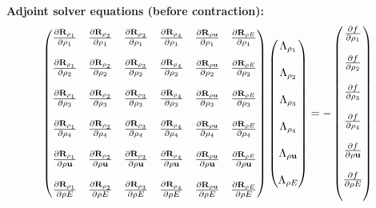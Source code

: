\documentclass[a4paper]{article}
\begin{document}
\begin{landscape}
\begin{huge}
  \newpage
  \bf{Adjoint solver equations (before contraction):}
  \begin{equation}
    \begin{pmatrix}
      \rdiff{\rho_1}{\rho_1}   & \rdiff{\rho_2}{\rho_1}   & \rdiff{\rho_3}{\rho_1}   & \rdiff{\rho_4}{\rho_1}   & \rdiff{\rho \vu}{\rho_1}   & \rdiff{\rho E}{\rho_1}   \\ \\
      \rdiff{\rho_1}{\rho_2}   & \rdiff{\rho_2}{\rho_2}   & \rdiff{\rho_3}{\rho_2}   & \rdiff{\rho_4}{\rho_2}   & \rdiff{\rho \vu}{\rho_2}   & \rdiff{\rho E}{\rho_2}   \\ \\
      \rdiff{\rho_1}{\rho_3}   & \rdiff{\rho_2}{\rho_3}   & \rdiff{\rho_3}{\rho_3}   & \rdiff{\rho_4}{\rho_3}   & \rdiff{\rho \vu}{\rho_3}   & \rdiff{\rho E}{\rho_3}   \\ \\
      \rdiff{\rho_1}{\rho_4}   & \rdiff{\rho_2}{\rho_4}   & \rdiff{\rho_3}{\rho_4}   & \rdiff{\rho_4}{\rho_4}   & \rdiff{\rho \vu}{\rho_4}   & \rdiff{\rho E}{\rho_4}   \\ \\
      \rdiff{\rho_1}{\rho \vu} & \rdiff{\rho_2}{\rho \vu} & \rdiff{\rho_3}{\rho \vu} & \rdiff{\rho_4}{\rho \vu} & \rdiff{\rho \vu}{\rho \vu} & \rdiff{\rho E}{\rho \vu} \\ \\
      \rdiff{\rho_1}{\rho E}   & \rdiff{\rho_2}{\rho E}   & \rdiff{\rho_3}{\rho E}   & \rdiff{\rho_4}{\rho E}   & \rdiff{\rho \vu}{\rho E}   & \rdiff{\rho E}{\rho E}
    \end{pmatrix}
    \begin{pmatrix}
      \adjlam{\rho_1} \\ \\
      \adjlam{\rho_2} \\ \\
      \adjlam{\rho_3} \\ \\
      \adjlam{\rho_4} \\ \\
      \adjlam{\rho \vu} \\ \\
      \adjlam{\rho E}
    \end{pmatrix}
    = -
    \begin{pmatrix}
      \pd{f}{\rho_1} \\ \\
      \pd{f}{\rho_2} \\ \\
      \pd{f}{\rho_3} \\ \\
      \pd{f}{\rho_4} \\ \\
      \pd{f}{\rho \vu} \\ \\
      \pd{f}{\rho E} \\ \\
    \end{pmatrix}
    \label{full-adjoint2}
  \end{equation}


\end{huge}
\end{landscape}
\end{document}
